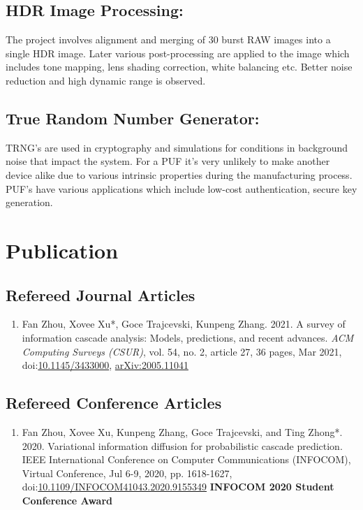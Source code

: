 \documentclass{article}
\newcommand{\cvsubsection}[1]{\subsection*{\rmfamily\hspace{1.6em}#1}}
\begin{document}
\cvsubsection{HDR Image Processing:}
\indent

The project involves alignment and merging of 30 burst RAW images into a single HDR image. Later various post-processing are applied to the image which includes tone mapping, lens shading correction, white balancing etc. Better noise reduction and high dynamic range is observed.

\cvsubsection{True Random Number Generator: }
\indent

TRNG’s are used in cryptography and simulations for conditions in background noise that impact the system. For a PUF it's very unlikely to make another device alike due to various intrinsic properties during the manufacturing process. PUF’s have various applications which include low-cost authentication, secure key generation.




\section*{Publication}

\cvsubsection{Refereed Journal Articles}

\begin{enumerate}[resume]
    \item Fan Zhou, Xovee Xu*, Goce Trajcevski, Kunpeng Zhang. 2021. A survey of information cascade analysis: Models, predictions, and recent advances. \textit{ACM Computing Surveys (CSUR)}, vol. 54, no. 2, article 27, 36 pages, Mar 2021, doi:\href{https://xovee.cn/html/paper-redirects/csur2021.html}{10.1145/3433000}, \href{https://arxiv.org/abs/2005.11041}{arXiv:2005.11041}
\end{enumerate}

\cvsubsection{Refereed Conference Articles}

\begin{enumerate}[resume]
    \item Fan Zhou, Xovee Xu, Kunpeng Zhang, Goce Trajcevski, and Ting Zhong*. 2020. Variational information diffusion for probabilistic cascade prediction. IEEE International Conference on Computer Communications (INFOCOM), Virtual Conference, Jul 6-9, 2020, pp. 1618-1627, doi:\href{https://doi.org/10.1109/INFOCOM41043.2020.9155349}{10.1109/INFOCOM41043.2020.9155349}
    \newline \textbf{\color{red}INFOCOM 2020 Student Conference Award}
\end{enumerate}
\end{document}
